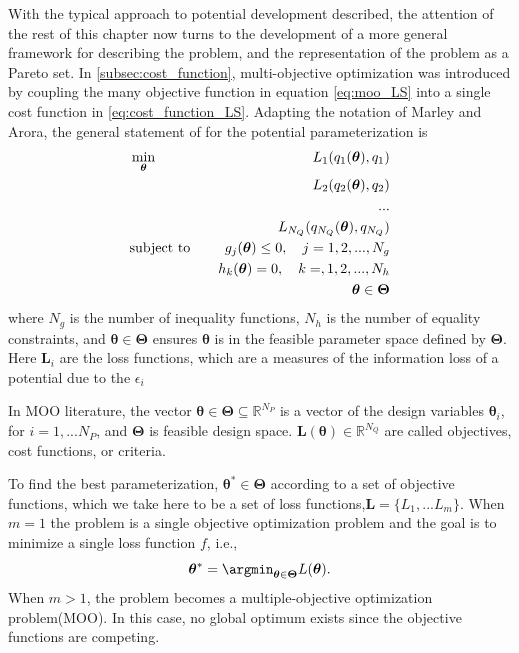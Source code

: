 With the typical approach to potential development described, the attention of the rest of this chapter now turns to the development of a more general framework for describing the problem, and the representation of the problem as a Pareto set.  In \ref{subsec:cost_function}, multi-objective optimization was introduced by coupling the many objective function in equation \ref{eq:moo_LS} into a single cost function in \ref{eq:cost_function_LS}.  Adapting the notation of Marley and Arora\cite{marler2004_moo_survey}, the general statement of for the potential parameterization is
\begin{subequations}
	\label{eq:moo}
\begin{align}
  &\min_{\bm{\theta}}	\quad
	  &L_1(q_1(\bm{\theta}),q_1) \\
	&	&L_2(q_2(\bm{\theta}),q_2) \notag \\
	& &... \notag \\
	&	&L_{N_Q}(q_{N_Q}(\bm{\theta}),q_{N_Q}) \notag \\
  &\text{subject to} \quad
	  &g_j(\bm{\theta}) \leq 0, \quad j=1,2,...,N_g \\
	& &h_k(\bm{\theta}) = 0, \quad k=,1,2,...,N_h \\
	& &\bm{\theta} \in \bm{\Theta}
\end{align}
\end{subequations}
where $N_g$ is the number of inequality functions, $N_h$ is the number of equality constraints, and $\bm{\theta} \in \bm{\Theta}$ ensures $\bm{\theta}$ is in the feasible parameter space defined by $\bm{\Theta}$.  Here $\bm{L}_i$ are the loss functions, which are a measures of the information loss of a potential due to the $\epsilon_i$

In MOO literature, the vector $\bm{\theta} \in \bm{\Theta} \subseteq \mathbb{R}^{N_P}$ is a vector of the design variables $\bm{\theta}_i$, for $i=1,...N_P$, and $\bm{\Theta}$ is feasible design space.  $\bm{L}(\bm{\theta}) \in \mathbb{R}^{N_Q}$ are called objectives, cost functions, or criteria.

To find the best parameterization, $\bm{\theta}^* \in \bm{\Theta}$ according to a set of objective functions, which we take here to be a set of loss functions,$\bm{L}=\{L_1,...L_m\}$.  When $m=1$ the problem is a single objective optimization problem and the goal is to minimize a single loss function $f$, i.e.,
\begin{equation}
	\bm{\theta}^* = \argmin_{\bm{\theta}\in\bm{\Theta}} L(\bm{\theta}).
\end{equation}
When $m>1$, the problem becomes a multiple-objective optimization problem(MOO).  In this case, no global optimum exists since the objective functions are competing.

